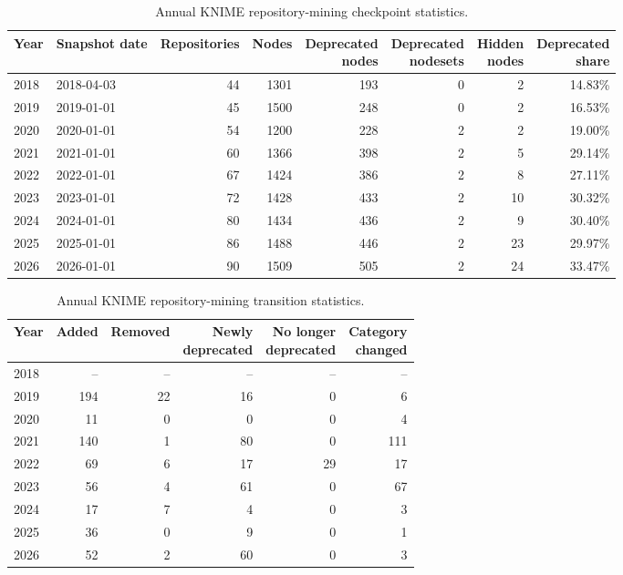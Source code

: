 \documentclass[runningheads]{llncs}
\begin{document}
\begin{table}
\centering
\caption{Annual KNIME repository-mining checkpoint statistics.}
\label{tab:annual-snapshots}
\scriptsize
\begin{tabular}{llrrrrrr}
\toprule
Year & Snapshot date & Repositories & Nodes &
\shortstack{Deprecated\\nodes} &
\shortstack{Deprecated\\nodesets} &
\shortstack{Hidden\\nodes} &
\shortstack{Deprecated\\share} \\
\midrule
2018 & 2018-04-03 & 44 & 1301 & 193 & 0 & 2 & 14.83\% \\
2019 & 2019-01-01 & 45 & 1500 & 248 & 0 & 2 & 16.53\% \\
2020 & 2020-01-01 & 54 & 1200 & 228 & 2 & 2 & 19.00\% \\
2021 & 2021-01-01 & 60 & 1366 & 398 & 2 & 5 & 29.14\% \\
2022 & 2022-01-01 & 67 & 1424 & 386 & 2 & 8 & 27.11\% \\
2023 & 2023-01-01 & 72 & 1428 & 433 & 2 & 10 & 30.32\% \\
2024 & 2024-01-01 & 80 & 1434 & 436 & 2 & 9 & 30.40\% \\
2025 & 2025-01-01 & 86 & 1488 & 446 & 2 & 23 & 29.97\% \\
2026 & 2026-01-01 & 90 & 1509 & 505 & 2 & 24 & 33.47\% \\
\bottomrule
\end{tabular}
\end{table}

\begin{table}
\centering
\caption{Annual KNIME repository-mining transition statistics.}
\label{tab:annual-transitions}
\scriptsize
\begin{tabular}{lrrrrr}
\toprule
Year & Added & Removed &
\shortstack{Newly\\deprecated} &
\shortstack{No longer\\deprecated} &
\shortstack{Category\\changed} \\
\midrule
2018 & -- & -- & -- & -- & -- \\
2019 & 194 & 22 & 16 & 0 & 6 \\
2020 & 11 & 0 & 0 & 0 & 4 \\
2021 & 140 & 1 & 80 & 0 & 111 \\
2022 & 69 & 6 & 17 & 29 & 17 \\
2023 & 56 & 4 & 61 & 0 & 67 \\
2024 & 17 & 7 & 4 & 0 & 3 \\
2025 & 36 & 0 & 9 & 0 & 1 \\
2026 & 52 & 2 & 60 & 0 & 3 \\
\bottomrule
\end{tabular}
\end{table}
\end{document}

